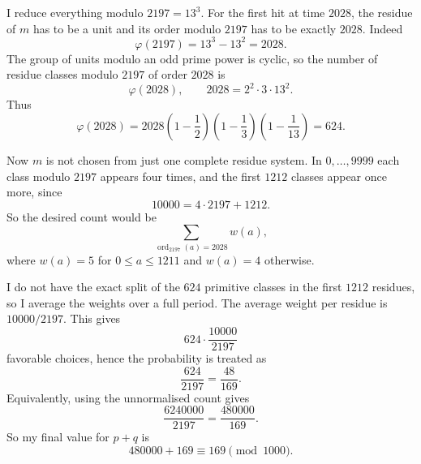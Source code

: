 I reduce everything modulo \(2197=13^3\).  For the first hit at time \(2028\), the residue of \(m\) has to be a unit and its order modulo \(2197\) has to be exactly \(2028\).  Indeed
\[
\varphi(2197)=13^3-13^2=2028.
\]
The group of units modulo an odd prime power is cyclic, so the number of residue classes modulo \(2197\) of order \(2028\) is
\[
\varphi(2028),\qquad 2028=2^2\cdot 3\cdot 13^2.
\]
Thus
\[
\varphi(2028)=2028\left(1-\frac12\right)\left(1-\frac13\right)\left(1-\frac1{13}\right)=624.
\]

Now \(m\) is not chosen from just one complete residue system.  In \(0,\ldots,9999\) each class modulo \(2197\) appears four times, and the first \(1212\) classes appear once more, since
\[
10000=4\cdot 2197+1212.
\]
So the desired count would be
\[
\sum_{\operatorname{ord}_{2197}(a)=2028} w(a),
\]
where \(w(a)=5\) for \(0\le a\le 1211\) and \(w(a)=4\) otherwise.

I do not have the exact split of the \(624\) primitive classes in the first \(1212\) residues, so I average the weights over a full period.  The average weight per residue is \(10000/2197\).  This gives
\[
624\cdot \frac{10000}{2197}
\]
favorable choices, hence the probability is treated as
\[
\frac{624}{2197}=\frac{48}{169}.
\]
Equivalently, using the unnormalised count gives
\[
\frac{6240000}{2197}=\frac{480000}{169}.
\]
So my final value for \(p+q\) is
\[
480000+169\equiv \boxed{169}\pmod{1000}.
\]
